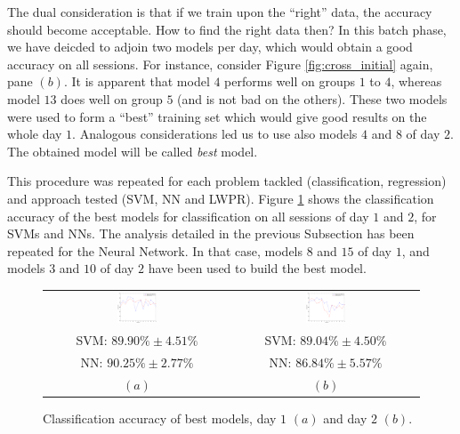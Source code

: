 
The dual consideration is that if we train upon the ``right'' data,
the accuracy should become acceptable. How to find the right data
then? In this batch phase, we have deicded to adjoin two models per
day, which would obtain a good accuracy on all sessions. For instance,
consider Figure \ref{fig:cross_initial} again, pane $(b)$. It is
apparent that model $4$ performs well on groups $1$ to $4$, whereas
model $13$ does well on group $5$ (and is not bad on the
others). These two models were used to form a ``best'' training set
which would give good results on the whole day $1$. Analogous
considerations led us to use also models $4$ and $8$ of day $2$. The
obtained model will be called \emph{best} model.

This procedure was repeated for each problem tackled (classification,
regression) and approach tested (SVM, NN and LWPR). Figure
\ref{fig:best_class} shows the classification accuracy of the best
models for classification on all sessions of day $1$ and $2$, for SVMs
and NNs. The analysis detailed in the previous Subsection has been
repeated for the Neural Network. In that case, models $8$ and $15$ of
day $1$, and models $3$ and $10$ of day $2$ have been used to build
the best model.

\begin{figure}[!ht] \centering
  \begin{tabular}{cc}
    \includegraphics[width=0.22\textwidth]{figs/fig_class_resCrossBestOnDay1} &
    \includegraphics[width=0.22\textwidth]{figs/fig_class_resCrossBestOnDay2} \\
    SVM: $89.90\% \pm 4.51\%$ & SVM: $89.04\% \pm 4.50\%$ \\
     NN: $90.25\% \pm 2.77\%$ &  NN: $86.84\% \pm 5.57\%$ \\
    $(a)$ & $(b)$ \\
  \end{tabular}
  \caption{Classification accuracy of best models, day $1$ $(a)$ and
    day $2$ $(b)$.}
  \label{fig:best_class}
\end{figure}

